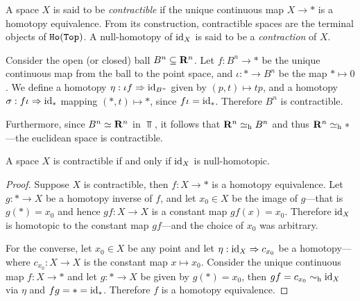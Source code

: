 \begin{definition}
    \label{def:contractible-space}
    A space \(X\) is said to be \emph{contractible} if the unique continuous map
    \(X \to *\) is a homotopy equivalence. From its construction, contractible
    spaces are the terminal objects of \({\texttt{Ho}(\texttt{Top})}\). A null-homotopy of \(\operatorname{id}_X\) is
    said to be a \emph{contraction} of \(X\).
\end{definition}

\begin{example}
    \label{exp:ball-contractible}
    Consider the open (or closed) ball \(B^n \subseteq \mathbf{R}^n\). Let \(f: B^n \to *\)
    be the unique continuous map from the ball to the point space, and
    \(\iota: * \to B^n\) be the map \(* \mapsto 0\). We define a homotopy
    \(\eta: \iota f \Rightarrow \operatorname{id}_{B^n}\) given by \((p, t) \mapsto t p\), and a homotopy
    \(\sigma: f \iota \Rightarrow \operatorname{id}_{*}\) mapping \((*, t) \mapsto *\), since
    \(f \iota = \operatorname{id}_{*}\). Therefore \(B^n\) is contractible.

    Furthermore, since \(B^n \simeq \mathbf{R}^n\) in \(\Top\), it follows that \(\mathbf{R}^n \simeq_{\text{h}}
    B^n\) and thus \(\mathbf{R}^n \simeq_{\text{h}} *\) ---the euclidean space is contractible.
\end{example}

\begin{proposition}
    \label{prop:contractible-iff-id-is-htpy-const}
    A space \(X\) is contractible if and only if \(\operatorname{id}_X\) is null-homotopic.
\end{proposition}

\begin{proof}
    Suppose \(X\) is contractible, then \(f: X \to *\) is a homotopy
    equivalence. Let \(g: * \to X\) be a homotopy inverse of \(f\), and let \(x_0
    \in X\) be the image of \(g\)---that is \(g(*) = x_0\) and hence \(g f: X \to
    X\) is a constant map \(g f(x) = x_0\). Therefore \(\operatorname{id}_X\) is homotopic to the
    constant map \(g f\)---and the choice of \(x_0\) was arbitrary.

    For the converse, let \(x_0 \in X\) be any point and let \(\eta: \operatorname{id}_X \Rightarrow
    c_{x_0}\) be a homotopy---where \(c_{x_0}: X \to X\) is the constant map \(x
    \mapsto x_0\). Consider the unique continuous map \(f: X \to *\) and let \(g: *
    \to X\) be given by \(g(*) = x_0\), then \(g f = c_{x_0} \sim_{\text{h}} \operatorname{id}_X\) via
    \(\eta\) and \(f g = * = \operatorname{id}_{*}\). Therefore \(f\) is a homotopy equivalence.
\end{proof}

